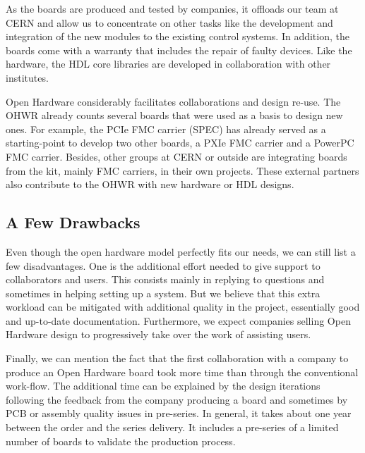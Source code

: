 \documentclass{JAC2003}
\begin{document}
As the boards are produced and tested by companies, it offloads our team at CERN and allow us to concentrate on other tasks like the development and integration of the new modules to the existing control systems.
In addition, the boards come with a warranty that includes the repair of faulty devices.
Like the hardware, the HDL core libraries are developed in collaboration with other institutes.

Open Hardware considerably facilitates collaborations and design re-use.
The OHWR already counts several boards that were used as a basis to design new ones.
For example, the PCIe FMC carrier (SPEC) has already served as a starting-point to develop two other boards, a PXIe FMC carrier and a PowerPC FMC carrier.
Besides, other groups at CERN or outside are integrating boards from the kit, mainly FMC carriers, in their own projects.
These external partners also contribute to the OHWR with new hardware or HDL designs.




\subsection{A Few Drawbacks}
Even though the open hardware model perfectly fits our needs, we can still list a few disadvantages.
One is the additional effort needed to give support to collaborators and users.
This consists mainly in replying to questions and sometimes in helping setting up a system.
But we believe that this extra workload can be mitigated with additional quality in the project, essentially good and up-to-date documentation.
Furthermore, we expect companies selling Open Hardware design to progressively take over the work of assisting users.

Finally, we can mention the fact that the first collaboration with a company to produce an Open Hardware board took more time than through the conventional work-flow.
The additional time can be explained by the design iterations following the feedback from the company producing a board and sometimes by PCB or assembly quality issues in pre-series.
In general, it takes about one year between the order and the series delivery.
It includes a pre-series of a limited number of boards to validate the production process.
\end{document}
